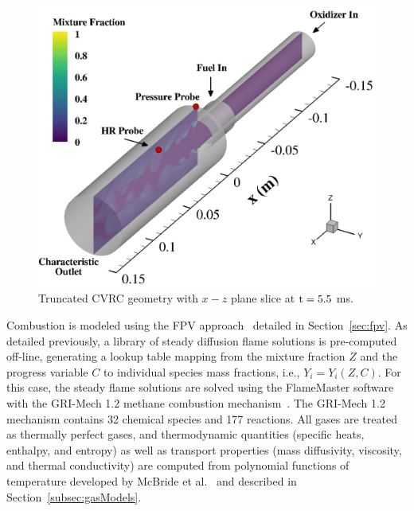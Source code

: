 \begin{figure}
	\centering
	\includegraphics[width=0.8\linewidth]{Chapters/HPROMResults/Images/cvrc/geom_hrProbe.png}
    \caption{\label{fig:cvrcGeom}
	Truncated CVRC geometry with $x-z$ plane slice at $\text{t} = 5.5$ ms.}
\end{figure}

Combustion is modeled using the FPV approach~\cite{Pierce2001} detailed in Section~\ref{sec:fpv}. As detailed previously, a library of steady diffusion flame solutions is pre-computed off-line, generating a lookup table mapping from the mixture fraction $Z$ and the progress variable $C$ to individual species mass fractions, i.e., $Y_i = Y_i(Z,C)$. For this case, the steady flame solutions are solved using the FlameMaster software~\cite{flamemaster} with the GRI-Mech 1.2 methane combustion mechanism~\cite{griMech}. The GRI-Mech 1.2 mechanism contains 32 chemical species and 177 reactions. All gases are treated as thermally perfect gases, and thermodynamic quantities (specific heats, enthalpy, and entropy) as well as transport properties (mass diffusivity, viscosity, and thermal conductivity) are computed from polynomial functions of temperature developed by McBride et al.~\cite{McBride1993} and described in Section~\ref{subsec:gasModels}.


